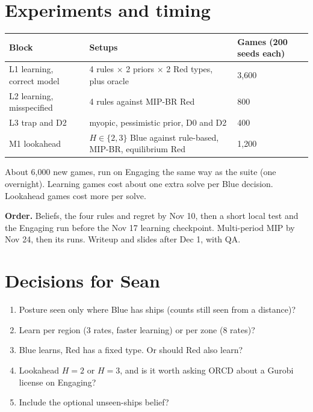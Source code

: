 \documentclass[10pt]{article}
\newcommand{\1}{\mathbf{1}}
\begin{document}
\section{Experiments and timing}
\begin{center}\small
\begin{tabular}{lll}
\toprule
Block & Setups & Games (200 seeds each)\\\midrule
L1 learning, correct model & 4 rules $\times$ 2 priors $\times$ 2 Red types, plus oracle & 3{,}600\\
L2 learning, misspecified & 4 rules against MIP-BR Red & 800\\
L3 trap and D2 & myopic, pessimistic prior, D0 and D2 & 400\\
M1 lookahead & $H\in\{2,3\}$ Blue against rule-based, MIP-BR, equilibrium Red & 1{,}200\\
\bottomrule
\end{tabular}\end{center}
About 6{,}000 new games, run on Engaging the same way as the suite (one overnight). Learning games cost about one
extra solve per Blue decision. Lookahead games cost more per solve.

\textbf{Order.} Beliefs, the four rules and regret by Nov 10, then a short local test and the Engaging run before the
Nov 17 learning checkpoint. Multi-period MIP by Nov 24, then its runs. Writeup and slides after Dec 1, with QA.

\section*{Decisions for Sean}
\begin{enumerate}
\item Posture seen only where Blue has ships (counts still seen from a distance)?
\item Learn per region (3 rates, faster learning) or per zone (8 rates)?
\item Blue learns, Red has a fixed type. Or should Red also learn?
\item Lookahead $H=2$ or $H=3$, and is it worth asking ORCD about a Gurobi license on Engaging?
\item Include the optional unseen-ships belief?
\end{enumerate}
\end{document}
